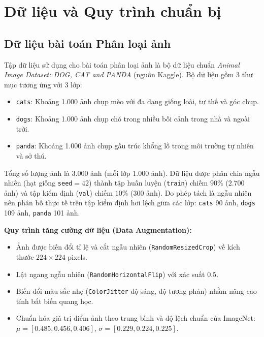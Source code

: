 \documentclass[fontsize=13pt,a4paper,oneside,DIV=calc,chapterprefix=true]{scrbook}
\begin{document}
\chapter{Dữ liệu và Quy trình chuẩn bị}
\label{chap:data}

\section{Dữ liệu bài toán Phân loại ảnh}
Tập dữ liệu sử dụng cho bài toán phân loại ảnh là bộ dữ liệu chuẩn \textit{Animal Image Dataset: DOG, CAT and PANDA} (nguồn Kaggle). Bộ dữ liệu gồm 3 thư mục tương ứng với 3 lớp:
\begin{itemize}[leftmargin=1.2cm]
    \item \texttt{cats}: Khoảng 1.000 ảnh chụp mèo với đa dạng giống loài, tư thế và góc chụp.
    \item \texttt{dogs}: Khoảng 1.000 ảnh chụp chó trong nhiều bối cảnh trong nhà và ngoài trời.
    \item \texttt{panda}: Khoảng 1.000 ảnh chụp gấu trúc khổng lồ trong môi trường tự nhiên và sở thú.
\end{itemize}
Tổng số lượng ảnh là $3.000$ ảnh (mỗi lớp $1.000$ ảnh). Dữ liệu được phân chia ngẫu nhiên (hạt giống \texttt{seed}$=42$) thành tập huấn luyện (\texttt{train}) chiếm $90\%$ ($2.700$ ảnh) và tập kiểm định (\texttt{val}) chiếm $10\%$ ($300$ ảnh). Do phép tách là ngẫu nhiên nên phân bố thực tế trên tập kiểm định hơi lệch giữa các lớp: \texttt{cats} 90 ảnh, \texttt{dogs} 109 ảnh, \texttt{panda} 101 ảnh.

\textbf{Quy trình tăng cường dữ liệu (Data Augmentation):}
\begin{itemize}[leftmargin=1.2cm]
    \item Ảnh được biến đổi tỉ lệ và cắt ngẫu nhiên (\texttt{RandomResizedCrop}) về kích thước $224 \times 224$ pixels.
    \item Lật ngang ngẫu nhiên (\texttt{RandomHorizontalFlip}) với xác suất $0.5$.
    \item Biến đổi màu sắc nhẹ (\texttt{ColorJitter} độ sáng, độ tương phản) nhằm nâng cao tính bất biến quang học.
    \item Chuẩn hóa giá trị điểm ảnh theo trung bình và độ lệch chuẩn của ImageNet: $\mu = [0.485, 0.456, 0.406]$, $\sigma = [0.229, 0.224, 0.225]$.
\end{itemize}
\end{document}
